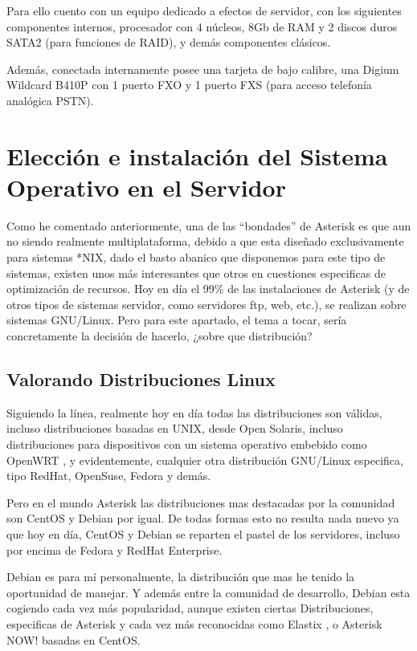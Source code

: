 Para ello cuento con un equipo dedicado a efectos de servidor, con los siguientes componentes internos, procesador con 4 núcleos, 8Gb de RAM y 2 discos duros SATA2 (para funciones de RAID), y demás componentes clásicos.

Además, conectada internamente posee una tarjeta de bajo calibre, una Digium Wildcard B410P con 1 puerto FXO y 1 puerto FXS (para acceso telefonía analógica PSTN).

\section{Elección e instalación del Sistema Operativo en el Servidor}

Como he comentado anteriormente, una de las “bondades” de Asterisk es que aun no siendo realmente multiplataforma, debido a que esta diseñado exclusivamente para sistemas *NIX, dado el basto abanico que disponemos para este tipo de sistemas, existen unos más interesantes que otros en cuestiones especificas de optimización de recursos. Hoy en día el 99\% de las instalaciones de Asterisk (y de otros tipos de sistemas servidor, como servidores ftp, web, etc.), se realizan sobre sistemas GNU/Linux. Pero para este apartado, el tema a tocar, sería concretamente la decisión de hacerlo, ¿sobre que distribución?

\subsection{Valorando Distribuciones Linux}

Siguiendo la línea, realmente hoy en día todas las distribuciones son válidas, incluso distribuciones basadas en UNIX, desde Open Solaris, incluso distribuciones para dispositivos con un sistema operativo embebido como OpenWRT \cite{website:openwrt}, y evidentemente, cualquier otra distribución GNU/Linux especifica, tipo RedHat, OpenSuse, Fedora y demás.

Pero en el mundo Asterisk las distribuciones mas destacadas por la comunidad son CentOS y Debian por igual. De todas formas esto no resulta nada nuevo ya que hoy en día, CentOS y Debian se reparten el pastel de los servidores, incluso por encima de Fedora y RedHat Enterprise.

Debian es para mí personalmente, la distribución que mas he tenido la oportunidad de manejar. Y además entre la comunidad de desarrollo, Debian esta cogiendo cada vez más popularidad, aunque existen ciertas Distribuciones, especificas de Asterisk y cada vez más reconocidas como Elastix \cite{website:elastix}, o Asterisk NOW! \cite{website:asterisknow} basadas en CentOS. 

